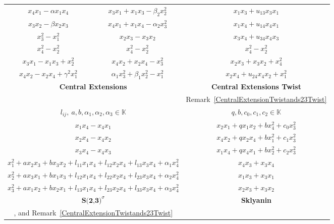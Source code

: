 \documentclass{amsart}
\begin{document}
\begin{table}[H]
{{\begin{tabular}{|c|c|c|}
$x_4 x_1 - \alpha x_1 x_4$ & $x_3 x_1 + x_1 x_3 - \beta_2 x_2^2$ & $x_1 x_3 + u_{13} x_3 x_1$ \\ 
$x_3 x_2 - \beta x_2 x_3$ & $x_4 x_1 + x_1 x_4 - \alpha_2 x_3^2$ & $x_1 x_4 + u_{14} x_4 x_1$ \\ 
$x_3^2 - x_1^2$ & $x_2 x_3 - x_3 x_2$ & $x_3 x_4 + u_{34} x_4 x_3$ \\ 
$x_4^2 - x_2^2$ & $x_4^2 - x_2^2$ & $x_4^2 - x_2^2$ \\ 
$x_3 x_1 - x_1 x_3 + x_2^2$ & $x_4 x_2 + x_2 x_4 - x_3^2$ & $x_2 x_3 + x_3 x_2 + x_4^2$ \\ 
$x_4 x_2 - x_2 x_4 + \gamma^2 x_1^2$ & $\alpha_1 x_3^2 + \beta_1 x_2^2 - x_1^2$ & $x_2 x_4 + u_{24} x_4 x_2 + x_1^2$ \\ \hline \hline
\multicolumn{2}{|c|}{\textbf{Central Extensions}} & \textbf{Central Extensions Twist} \\
\hline \hline
\multicolumn{2}{|c|}{\cite[Equation 1.1]{MR1429334}} & 
Remark~\ref{CentralExtensionTwistands23Twist}\\ \hline
\multicolumn{2}{|c|}{$l_{ij},\ a,b, \alpha_1,\alpha_2,\alpha_3 \in \mathbb{K}$} & $q,b,c_0,c_1,c_2 \in \mathbb{K}$ \\
\hline
\multicolumn{2}{|c|}{$x_1 x_4 - x_4 x_1$} & $x_2 x_1 + q x_1 x_2 + b x_4^2 + c_0 x_3^2$ \\
\multicolumn{2}{|c|}{$x_2 x_4 - x_4 x_2$} & $x_4 x_2 + q x_2 x_4 + b x_1^2 + c_1 x_3^2$ \\
\multicolumn{2}{|c|}{$x_3 x_4 - x_4 x_3$} & $x_1 x_4 + q x_4 x_1 + b x_2^2 + c_2 x_3^2 $ \\
\multicolumn{2}{|c|}{\small $ x_1^2 + a x_2 x_3 + b x_3 x_2 + l_{11} x_1 x_4 + l_{12} x_2 x_4 + l_{13} x_3 x_4 + \alpha_1 x_4^2$} & $x_4 x_3 + x_3 x_4$ \\
\multicolumn{2}{|c|}{\small $ x_2^2 + a x_3 x_1 + b x_1 x_3 + l_{12} x_1 x_4 + l_{22} x_2 x_4 + l_{23} x_3 x_4 + \alpha_2 x_4^2$} & $x_1 x_3 + x_3 x_1 $ \\
\multicolumn{2}{|c|}{\small $ x_3^2 + a x_1 x_2 + b x_2 x_1 + l_{13} x_1 x_4 + l_{23} x_2 x_4 + l_{33} x_3 x_4 + \alpha_3 x_4^2$} & $x_2 x_3 + x_3 x_2 $ \\
\hline
\hline
\multicolumn{2}{|c|}{$\textbf{S(2,3)}^\sigma$} & \textbf{Sklyanin} \\
\hline \hline
\multicolumn{2}{|c|}{\cite[Table 8.2]{Pym2013PoissonSA}, and Remark~\ref{CentralExtensionTwistands23Twist}} & \cite[Equation 0.2.2]{Smith1992} \\ \hline


\end{tabular}}}
\end{table}
\end{document}

